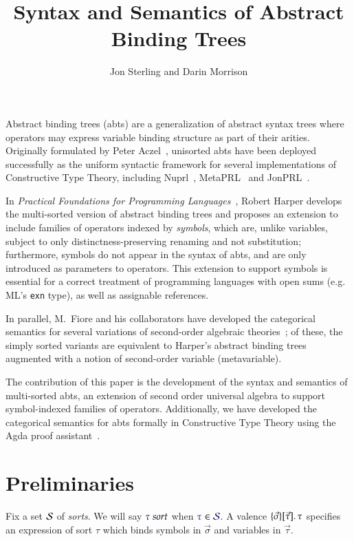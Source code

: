 \documentclass[11pt]{article}
\theoremstyle{definition}
\theoremstyle{remark}
\numberwithin{equation}{section}
\begin{document}
\title{Syntax and Semantics of Abstract Binding Trees}
\date{}
\author{Jon Sterling and Darin Morrison}
\maketitle

Abstract binding trees (abts) are a generalization of abstract syntax trees
where operators may express variable binding structure as part of their arities.
Originally formulated by Peter Aczel~\cite{aczel:1978}, unisorted abts have been
deployed successfully as the uniform syntactic framework for several
implementations of Constructive Type Theory, including
Nuprl~\cite{constable:1986}, MetaPRL~\cite{hickey:2003} and
JonPRL~\cite{jonprl:2015}.

In \emph{Practical Foundations for Programming Languages}~\cite{harper:2016},
Robert Harper develops the multi-sorted version of abstract binding trees and
proposes an extension to include families of operators indexed by
\emph{symbols}, which are, unlike variables, subject to only
distinctness-preserving renaming and not substitution; furthermore, symbols do
not appear in the syntax of abts, and are only introduced as parameters to
operators. This extension to support symbols is essential for a correct
treatment of programming languages with open sums (e.g. ML's \texttt{exn} type),
as well as assignable references.

In parallel, M.\ Fiore and his collaborators have developed the categorical
semantics for several variations of second-order algebraic
theories~\cite{fiore:1999, fiore:2005, fiore-hur:2010, fiore-mamoud:2010}; of
these, the simply sorted variants are equivalent to Harper's abstract binding
trees augmented with a notion of second-order variable (metavariable).

The contribution of this paper is the development of the syntax and semantics of
multi-sorted abts, an extension of second order universal algebra to support
symbol-indexed families of operators. Additionally, we have developed the
categorical semantics for abts formally in Constructive Type Theory using the
Agda proof assistant~\cite{norell:2007}.

\section{Preliminaries}

Fix a set $\mathcal{S}$ of \emph{sorts}. We will say $\IsSort{\tau}$ when
$\Member{\tau}{\Sorts}$. A valence $\MkValence{\vec{\sigma}}{\vec{\tau}}{\tau}$
specifies an expression of sort $\tau$ which binds symbols in $\vec{\sigma}$ and
variables in $\vec{\tau}$.
\end{document}
